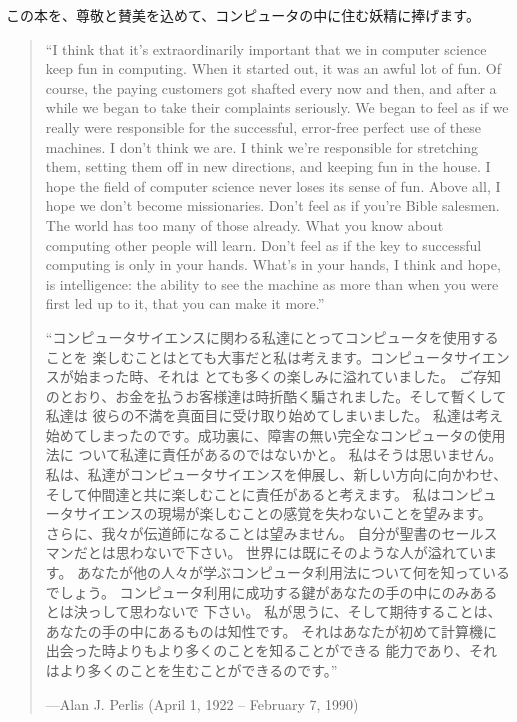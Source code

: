 \documentclass[8pt,oneside]{book}
\begin{document}
この本を、尊敬と賛美を込めて、コンピュータの中に住む妖精に捧げます。

\begin{quote}
``I think that it's extraordinarily important that we in computer science keep
fun in computing.  When it started out, it was an awful lot of fun. Of course,
the paying customers got shafted every now and then, and after a while we began
to take their complaints seriously.  We began to feel as if we really were
responsible for the successful, error-free perfect use of these machines. 
I don't think we are.  I think we're responsible for stretching them, setting
them off in new directions, and keeping fun in the house.  I hope the field of
computer science never loses its sense of fun.  Above all, I hope we don't
become missionaries.  Don't feel as if you're Bible salesmen.   The world has
too many of those already.  What you know about computing other people will
learn. Don't feel as if the key to successful computing is only in your hands.
What's in your hands, I think and hope, is intelligence: the ability to see the
machine as more than when you were first led up to it, that you can make it
more.''

``コンピュータサイエンスに関わる私達にとってコンピュータを使用することを
楽しむことはとても大事だと私は考えます。コンピュータサイエンスが始まった時、それは
とても多くの楽しみに溢れていました。
ご存知のとおり、お金を払うお客様達は時折酷く騙されました。そして暫くして私達は
彼らの不満を真面目に受け取り始めてしまいました。
私達は考え始めてしまったのです。成功裏に、障害の無い完全なコンピュータの使用法に
ついて私達に責任があるのではないかと。
私はそうは思いません。
私は、私達がコンピュータサイエンスを伸展し、新しい方向に向かわせ、
そして仲間達と共に楽しむことに責任があると考えます。
私はコンピュータサイエンスの現場が楽しむことの感覚を失わないことを望みます。
さらに、我々が伝道師になることは望みません。
自分が聖書のセールスマンだとは思わないで下さい。
世界には既にそのような人が溢れています。
あなたが他の人々が学ぶコンピュータ利用法について何を知っているでしょう。
コンピュータ利用に成功する鍵があなたの手の中にのみあるとは決っして思わないで
下さい。
 私が思うに、そして期待することは、あなたの手の中にあるものは知性です。
それはあなたが初めて計算機に出会った時よりもより多くのことを知ることができる
能力であり、それはより多くのことを生むことができるのです。''

\noindent
---Alan J. Perlis (April 1, 1922 -- February 7, 1990)
\end{quote}


\label{Chapter 1}
\end{document}
